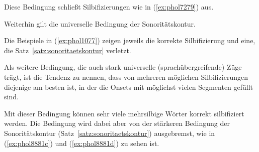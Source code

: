 Diese Bedingung schließt Silbifizierungen wie in (\ref{ex:phol7279}) aus.

\begin{exe}
  \ex\label{ex:phol7279}
  \begin{xlist}
  \end{xlist}
\end{exe}

Weiterhin gilt die universelle Bedingung der Sonoritätskontur.


Die Beispiele in (\ref{ex:phol1077}) zeigen jeweils die korrekte Silbifizierung und eine, die Satz~\ref{satz:sonoritaetskontur} verletzt.

\begin{exe}
  \ex\label{ex:phol1077}
  \begin{xlist}
  \end{xlist}
\end{exe}

Als weitere Bedingung, die auch stark universelle (sprachübergreifende) Züge trägt, ist die Tendenz zu nennen, dass von mehreren möglichen Silbifizierungen diejenige am besten ist, in der die Onsets mit möglichst vielen Segmenten gefüllt sind.


Mit dieser Bedingung können sehr viele mehrsilbige Wörter korrekt silbifiziert werden.
Die Bedingung wird dabei aber von der stärkeren Bedingung der Sonoritätskontur (Satz~\ref{satz:sonoritaetskontur}) ausgebremst, wie in (\ref{ex:phol8881c}) und (\ref{ex:phol8881d}) zu sehen ist.

\begin{exe}
  \ex\label{ex:phol8881}
  \begin{xlist}
  \end{xlist}
\end{exe}

